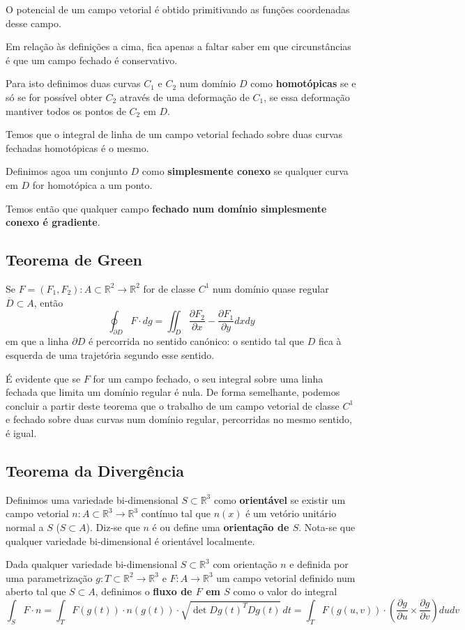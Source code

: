 \documentclass{article}
\newcommand{\R}{\mathbb{R}}
\begin{document}
O potencial de um campo vetorial é obtido primitivando as funções coordenadas desse campo. 

Em relação às definições a cima, fica apenas a faltar saber em que circunstâncias é que um campo fechado é conservativo.

Para isto definimos duas curvas $C_1$ e $C_2$ num domínio $D$ como \textbf{homotópicas} se e só se for possível obter $C_2$ através de uma deformação de $C_1$, se essa deformação mantiver todos os pontos de $C_2$ em $D$.

Temos que o integral de linha de um campo vetorial fechado sobre duas curvas fechadas homotópicas é o mesmo.

Definimos agoa um conjunto $D$ como \textbf{simplesmente conexo} se qualquer curva em $D$ for homotópica a um ponto.

Temos então que qualquer campo \textbf{fechado num domínio simplesmente conexo é gradiente}.

\subsection{Teorema de Green}
Se $F=(F_1,F_2): A \subset \R^2 \to \R^2$ for de classe $C^1$ num domínio quase regular $\overline{D} \subset A$, então
$$
\oint_{\partial D} F \cdot dg = \iint_D \frac{\partial F_2}{\partial x} - \frac{\partial F_1}{\partial y} dx dy
$$
em que a linha $\partial D$ é percorrida no sentido canónico: o sentido tal que $D$ fica à esquerda de uma trajetória segundo esse sentido.

É evidente que se $F$ for um campo fechado, o seu integral sobre uma linha fechada que limita um domínio regular é nula. De forma semelhante, podemos concluir a partir deste teorema que o trabalho de um campo vetorial de classe $C^1$ e fechado sobre duas curvas num domínio regular, percorridas no mesmo sentido, é igual.

\subsection{Teorema da Divergência}
Definimos uma variedade bi-dimensional $S \subset \R^3$ como \textbf{orientável} se existir um campo vetorial $n: A \subset \R^3 \to \R^3$ contínuo tal que $n(x)$ é um vetório unitário normal a $S$ ($S \subset A$). Diz-se que $n$ é ou define uma \textbf{orientação de $S$}. Nota-se que qualquer variedade bi-dimensional é orientável localmente.

Dada qualquer variedade bi-dimensional $S \subset \R^3$ com orientação $n$ e definida por uma parametrização $g:T \subset \R^2 \to \R^3$ e $F: A \to \R^3$ um campo vetorial definido num aberto tal que $S \subset A$, definimos o \textbf{fluxo de $F$ em $S$} como o valor do integral
$$ \int_S F \cdot n 
= \int_T F(g(t)) \cdot n(g(t)) \cdot \sqrt{\det Dg(t)^T Dg(t)} \, dt 
= \int_T F(g(u,v)) \cdot \left( \frac{\partial g}{\partial u} \times 
\frac{\partial g}{\partial v} \right) du dv$$
\end{document}
